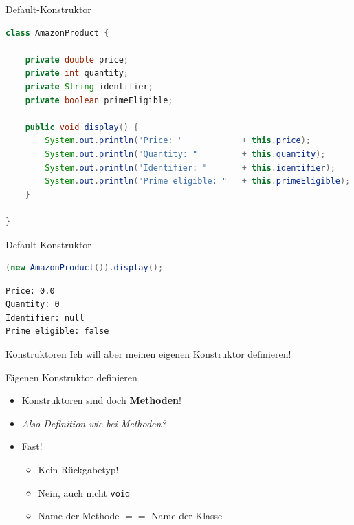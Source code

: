 \documentclass[18pt]{beamer}
\begin{document}
\begin{frame}[fragile]{Default-Konstruktor}
    \begin{exampleblock}{}
        \begin{lstlisting}[language=Java,basicstyle=\scriptsize]
class AmazonProduct {

    private double price;
    private int quantity;
    private String identifier;
    private boolean primeEligible;

    public void display() {
        System.out.println("Price: "            + this.price);
        System.out.println("Quantity: "         + this.quantity);
        System.out.println("Identifier: "       + this.identifier);
        System.out.println("Prime eligible: "   + this.primeEligible);
    }

}
        \end{lstlisting}

    \end{exampleblock}

\end{frame}

\begin{frame}[fragile]{Default-Konstruktor}
\begin{exampleblock}{}
    \begin{lstlisting}[language=Java]
(new AmazonProduct()).display();
    \end{lstlisting}
\end{exampleblock}

    \begin{exampleblock}{}
        \begin{lstlisting}
Price: 0.0
Quantity: 0
Identifier: null
Prime eligible: false
        \end{lstlisting}
    \end{exampleblock}
\end{frame}

\begin{frame}{Konstruktoren}
    \center
    \Huge{Ich will aber meinen eigenen Konstruktor definieren!}
\end{frame}

\begin{frame}{Eigenen Konstruktor definieren}
    \begin{itemize}
        \item Konstruktoren sind doch \textbf{Methoden}!
        \pause
        \item \textit{Also Definition wie bei Methoden?}
        \pause
        \item Fast!
        \begin{itemize}
            \item Kein Rückgabetyp!
            \item Nein, auch nicht \texttt{void}
            \item Name der Methode $==$ Name der Klasse
        \end{itemize}
    \end{itemize}
\end{frame}
\end{document}

